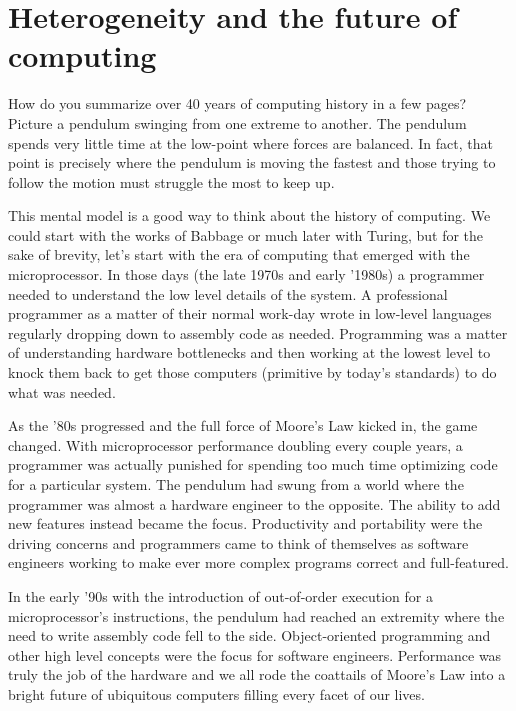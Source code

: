 
\def\ArtDir{01.HeteroComp/figures}%

\chapter{Heterogeneity and the future of computing}
\label{chapter:heterogeneity}

How do you summarize over 40 years of computing history in a few pages?   
Picture a pendulum swinging from one extreme to another.  The pendulum spends very little time at
the low-point where forces are balanced.  In fact, that point is precisely where the pendulum is
moving the fastest and those trying to follow the motion must struggle the most  to keep up.

This mental model is a good way to think about the history of computing.  We could start with the
works of Babbage or much later with Turing, but for the sake of brevity, let's start with the era of computing
that emerged with the microprocessor.  In those days (the late 1970s and early '1980s) a programmer
needed to understand the low level details of the system.  A professional programmer as a matter
of their normal work-day wrote in low-level languages regularly dropping down to assembly code 
as needed.   Programming was a matter of understanding hardware bottlenecks and then working at the lowest 
level to knock them back to get those computers (primitive by today's standards) to do what was needed.

As the '80s progressed and the full force of Moore's Law kicked in, the game changed.   With
microprocessor performance doubling every couple years, a programmer was actually punished for 
spending too much time optimizing code for a particular system.  The pendulum had swung from
a world where the programmer was almost a hardware engineer to the opposite.  The ability to 
add new features instead became the focus.  Productivity and portability were the driving concerns and
programmers came to think of themselves as software engineers working to make ever more
complex programs correct and full-featured.

In the early '90s with the introduction of out-of-order execution for a microprocessor's instructions, the 
pendulum had reached an extremity where the need to write assembly code fell to the side.  Object-oriented
programming and other high level concepts were the focus for software engineers.  Performance was
truly the job of the hardware and we all rode the coattails of Moore's Law into a bright future of
ubiquitous computers filling every facet of our lives.

